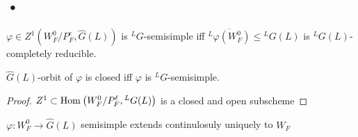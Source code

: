 \documentclass[12pt]{article}
\begin{document}
\subsection{•}

\begin{defn}
$\varphi \in Z^1(W_F^0/P_F^e, \hat{G}(L))$ is ${}^L G$-semisimple iff $\overline{{}^L \varphi(W_F^0)} \le {}^L G(L)$ is ${}^L G(L)$-completely reducible.
\end{defn}

\begin{theorem}
$\hat{G}(L)$-orbit of $\varphi$ is closed iff $\varphi$ is ${}^L G$-semisimple.
\end{theorem}

\begin{proof}
$Z^1 \subset \mathrm{Hom}_{} \left( W_F^0/P_F^\ell, {}^L G(L) \right)$ is a closed and open subscheme
\end{proof}

\begin{prop}
$\varphi : W_F^0 \to \hat{G}(L)$ semisimple extends continulosuly uniquely to $W_F$
\end{prop}
\end{document}
